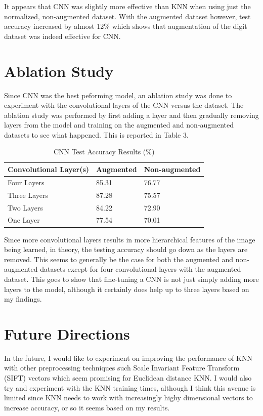 \documentclass{article}
\begin{document}
It appears that CNN was slightly more effective than KNN when using just the
normalized, non-augmented dataset. With the augmented dataset however, test
accuracy increased by almost 12\% which shows that augmentation of the digit
dataset was indeed effective for CNN.

\section{Ablation Study}

Since CNN was the best peforming model, an ablation study was done to experiment
with the convolutional layers of the CNN versus the dataset. The ablation study
was performed by first adding a layer and then gradually removing layers from
the model and training on the augmented and non-augmented datasets to see what
happened. This is reported in Table 3.

\begin{table}[h]
  \caption{CNN Test Accuracy Results (\%)}
  \centering
  \begin{tabular}{lll}
    \toprule
    Convolutional Layer(s) & Augmented & Non-augmented \\
    \midrule
    Four Layers & 85.31 & 76.77\\
    Three Layers & 87.28 & 75.57\\
    Two Layers & 84.22 & 72.90\\
    One Layer & 77.54 & 70.01\\
    \bottomrule
  \end{tabular}
\end{table}

Since more convolutional layers results in more hierarchical features of the
image being learned, in theory, the testing accuracy should go down as the
layers are removed. This seems to generally be the case for both the augmented
and non-augmented datasets except for four convolutional layers with the
augmented dataset. This goes to show that fine-tuning a CNN is not just simply
adding more layers to the model, although it certainly does help up to three
layers based on my findings.

\section{Future Directions}

In the future, I would like to experiment on improving the performance of KNN
with other preprocessing techniques such Scale Invariant Feature Transform
(SIFT) vectors which seem promising for Euclidean distance KNN. I would also try
and experiment with the KNN training times, although I think this avenue is
limited since KNN needs to work with increasingly highy dimensional vectors to
increase accuracy, or so it seems based on my results.
\end{document}
